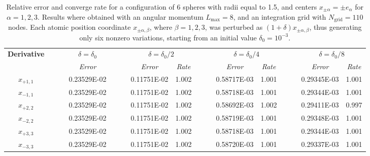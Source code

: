 \begin{table}[t]
\footnotesize
\begin{center}
	\begin{tabular}{ @{}cccc  cccc  cccc @{} }
\toprule[0.1em] 
\multirow{2}{*}{\bf Derivative} & $\phantom{abs}$ &  \multicolumn{1}{c}{$\delta = \delta_0$}& $\phantom{abs}$  & \multicolumn{2}{c}{$\delta = \delta_0/2$}& $\phantom{abs}$  & \multicolumn{2}{c}{$\delta = \delta_0/4$}& $\phantom{abs}$  & \multicolumn{2}{c}{$\delta = \delta_0/8$} \\
		         \cmidrule[0.05em]{3-3}  \cmidrule[0.05em](lr){5-6}  \cmidrule[0.05em]{8-9}   \cmidrule[0.05em]{11-12}
&	& {\sl Error}	&& {\sl Error}	& {\sl Rate} && {\sl Error}	& {\sl Rate}&& {\sl Error}	& {\sl Rate} \\
\midrule[0.05em]
$x_{+1,1}$ &  &  0.23529E-02  &  &    0.11751E-02  &  1.002  &&  0.58717E-03  &  1.001  &&  0.29345E-03  &  1.001  \\
$x_ {-1,1}$  &&  0.23529E-02  &   &  0.11751E-02  &  1.002  &&  0.58718E-03  &  1.001  &&  0.29344E-03  &  1.001  \\
$x_ {+2,2}$  &&  0.23529E-02  &   & 0.11751E-02  &  1.002  &&  0.58692E-03  &  1.002  &&  0.29411E-03  &  0.997  \\
$x_ {-2,2}$  &&  0.23529E-02  &    &0.11751E-02  &  1.002  &&  0.58719E-03  &  1.001  &&  0.29348E-03  &  1.001  \\
$x_ {+3,3}$  &&  0.23529E-02  &  &  0.11751E-02  &  1.002  &&  0.58718E-03  &  1.001  &&  0.29344E-03  &  1.001  \\
$x_ {-3,3}$  &&  0.23529E-02  &   &  0.11751E-02  &  1.002  &&  0.58720E-03  &  1.001  &&  0.29337E-03  &  1.001  \\
\bottomrule[0.1em]
\end{tabular}
\caption{Relative error and converge rate for a configuration of 6 spheres with radii equal to 1.5, and centers $x_{\pm \alpha} =  \pm e_\alpha$ for $\alpha = 1, 2,3$.  Results where obtained with an angular momentum $L_\text{max} =  8$, and an integration grid with $N_\text{grid} = 110$ nodes. Each atomic position coordinate $x_{\pm\alpha,\beta}$, where $\beta = 1,2,3$, was perturbed as $(1 + \delta)x_{\pm\alpha , \beta}$, thus generating only six nonzero variations, starting from an initial value $\delta_0 = 10^{-3}$.}\label{tab:1}
\end{center}
\end{table}

